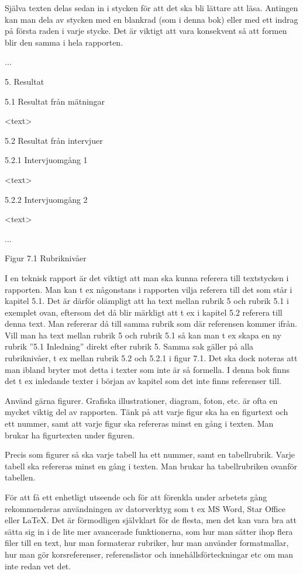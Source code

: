 Själva texten delas sedan in i stycken för att det ska bli lättare att
läsa. Antingen kan man dela av stycken med en blankrad (som i denna bok)
eller med ett indrag på första raden i varje stycke. Det är viktigt att
vara konsekvent så att formen blir den samma i hela rapporten.

...

5. Resultat

5.1 Resultat från mätningar

\textless{}text\textgreater{}

5.2 Resultat från intervjuer

5.2.1 Intervjuomgång 1

\textless{}text\textgreater{}

5.2.2 Intervjuomgång 2

\textless{}text\textgreater{}

...

Figur 7.1 Rubriknivåer

I en teknisk rapport är det viktigt att man ska kunna referera till
textstycken i rapporten. Man kan t ex någonstans i rapporten vilja
referera till det som står i kapitel 5.1. Det är därför olämpligt att ha
text mellan rubrik 5 och rubrik 5.1 i exemplet ovan, eftersom det då
blir märkligt att t ex i kapitel 5.2 referera till denna text. Man
refererar då till samma rubrik som där referensen kommer ifrån. Vill man
ha text mellan rubrik 5 och rubrik 5.1 så kan man t ex skapa en ny
rubrik ''5.1 Inledning'' direkt efter rubrik 5. Samma sak gäller på alla
rubriknivåer, t ex mellan rubrik 5.2 och 5.2.1 i figur 7.1. Det ska dock
noteras att man ibland bryter mot detta i texter som inte är så
formella. I denna bok finns det t ex inledande texter i början av
kapitel som det inte finns referenser till.

Använd gärna figurer. Grafiska illustrationer, diagram, foton, etc. är
ofta en mycket viktig del av rapporten. Tänk på att varje figur ska ha
en figurtext och ett nummer, samt att varje figur ska refereras minst en
gång i texten. Man brukar ha figurtexten under figuren.

Precis som figurer så ska varje tabell ha ett nummer, samt en
tabellrubrik. Varje tabell ska refereras minst en gång i texten. Man
brukar ha tabellrubriken ovanför tabellen.

För att få ett enhetligt utseende och för att förenkla under arbetets
gång rekommenderas användningen av datorverktyg som t ex MS Word, Star
Office eller LaTeX. Det är förmodligen självklart för de flesta, men det
kan vara bra att sätta sig in i de lite mer avancerade funktionerna, som
hur man sätter ihop flera filer till en text, hur man formaterar
rubriker, hur man använder formatmallar, hur man gör korsreferenser,
referenslistor och innehållsförteckningar etc om man inte redan vet det.

